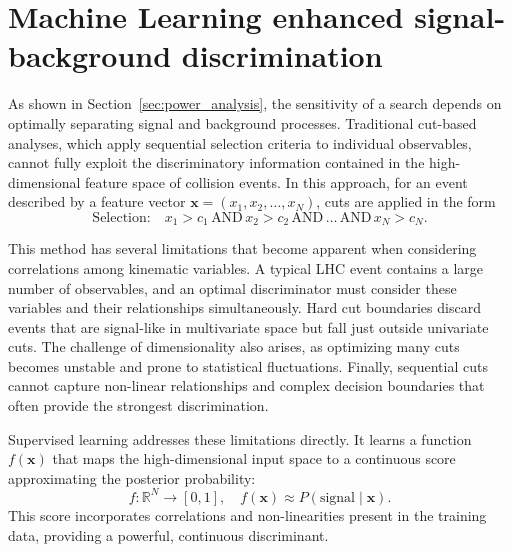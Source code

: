 \section{Machine Learning enhanced signal-background discrimination}
\label{sec:machine_learning}

As shown in Section~\ref{sec:power_analysis}, the sensitivity of a search depends on optimally separating signal and background processes. Traditional cut-based analyses, which apply sequential selection criteria to individual observables, cannot fully exploit the discriminatory information contained in the high-dimensional feature space of collision events. In this approach, for an event described by a feature vector $\mathbf{x} = (x_1, x_2, \ldots, x_N)$, cuts are applied in the form
\begin{equation}
\text{Selection:} \quad x_1 > c_1 \,\text{AND}\, x_2 > c_2 \,\text{AND}\, \ldots \,\text{AND}\, x_N > c_N.
\end{equation}

This method has several limitations that become apparent when considering correlations among kinematic variables. A typical LHC event contains a large number of observables, and an optimal discriminator must consider these variables and their relationships simultaneously. Hard cut boundaries discard events that are signal-like in multivariate space but fall just outside univariate cuts. The challenge of dimensionality also arises, as optimizing many cuts becomes unstable and prone to statistical fluctuations. Finally, sequential cuts cannot capture non-linear relationships and complex decision boundaries that often provide the strongest discrimination.

Supervised learning addresses these limitations directly. It learns a function $f(\mathbf{x})$ that maps the high-dimensional input space to a continuous score approximating the posterior probability:
\begin{equation}
f: \mathbb{R}^N \rightarrow [0,1], \quad f(\mathbf{x}) \approx P(\text{signal} \mid \mathbf{x}).
\end{equation}
This score incorporates correlations and non-linearities present in the training data, providing a powerful, continuous discriminant.

